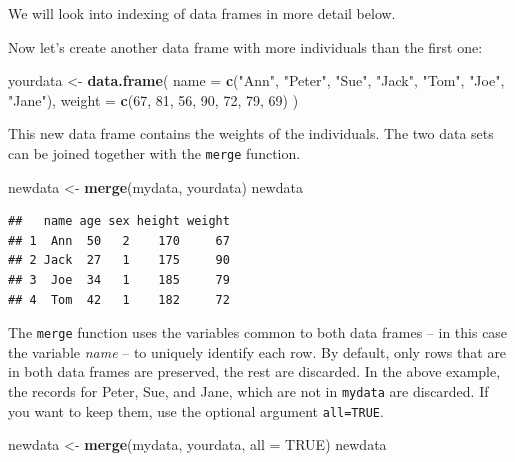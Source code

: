 \documentclass[
]{book}
\newenvironment{Shaded}{\begin{snugshade}}{\end{snugshade}}
\newcommand{\AttributeTok}[1]{\textcolor[rgb]{0.13,0.29,0.53}{#1}}
\newcommand{\ConstantTok}[1]{\textcolor[rgb]{0.56,0.35,0.01}{#1}}
\newcommand{\DecValTok}[1]{\textcolor[rgb]{0.00,0.00,0.81}{#1}}
\newcommand{\FunctionTok}[1]{\textcolor[rgb]{0.13,0.29,0.53}{\textbf{#1}}}
\newcommand{\NormalTok}[1]{#1}
\newcommand{\OtherTok}[1]{\textcolor[rgb]{0.56,0.35,0.01}{#1}}
\newcommand{\StringTok}[1]{\textcolor[rgb]{0.31,0.60,0.02}{#1}}
\begin{document}
We will look into indexing of data frames in more detail below.

Now let's create another data frame with more individuals than the
first one:

\begin{Shaded}
\begin{Highlighting}[]
\NormalTok{yourdata }\OtherTok{\textless{}{-}} \FunctionTok{data.frame}\NormalTok{(}
  \AttributeTok{name =} \FunctionTok{c}\NormalTok{(}\StringTok{"Ann"}\NormalTok{, }\StringTok{"Peter"}\NormalTok{, }\StringTok{"Sue"}\NormalTok{, }\StringTok{"Jack"}\NormalTok{, }\StringTok{"Tom"}\NormalTok{, }\StringTok{"Joe"}\NormalTok{, }\StringTok{"Jane"}\NormalTok{),}
  \AttributeTok{weight =} \FunctionTok{c}\NormalTok{(}\DecValTok{67}\NormalTok{, }\DecValTok{81}\NormalTok{, }\DecValTok{56}\NormalTok{, }\DecValTok{90}\NormalTok{, }\DecValTok{72}\NormalTok{, }\DecValTok{79}\NormalTok{, }\DecValTok{69}\NormalTok{)}
\NormalTok{)}
\end{Highlighting}
\end{Shaded}

This new data frame contains the weights of the individuals. The two
data sets can be joined together with the \texttt{merge} function.

\begin{Shaded}
\begin{Highlighting}[]
\NormalTok{newdata }\OtherTok{\textless{}{-}} \FunctionTok{merge}\NormalTok{(mydata, yourdata)}
\NormalTok{newdata}
\end{Highlighting}
\end{Shaded}

\begin{verbatim}
##   name age sex height weight
## 1  Ann  50   2    170     67
## 2 Jack  27   1    175     90
## 3  Joe  34   1    185     79
## 4  Tom  42   1    182     72
\end{verbatim}

The \texttt{merge} function uses the variables common to both data
frames -- in this case the variable \emph{name} -- to uniquely identify
each row. By default, only rows that are in both data frames are
preserved, the rest are discarded. In the above example, the records
for Peter, Sue, and Jane, which are not in \texttt{mydata} are
discarded. If you want to keep them, use the optional argument \texttt{all=TRUE}.

\begin{Shaded}
\begin{Highlighting}[]
\NormalTok{newdata }\OtherTok{\textless{}{-}} \FunctionTok{merge}\NormalTok{(mydata, yourdata, }\AttributeTok{all =} \ConstantTok{TRUE}\NormalTok{)}
\NormalTok{newdata}
\end{Highlighting}
\end{Shaded}
\end{document}
